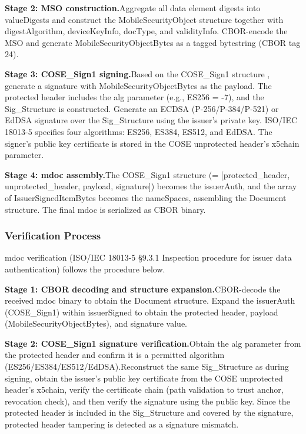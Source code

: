 \documentclass[conference]{IEEEtran}
\begin{document}
\textbf{Stage 2: MSO construction.}Aggregate all data element digests into valueDigests and construct the MobileSecurityObject structure together with digestAlgorithm, deviceKeyInfo, docType, and validityInfo. CBOR-encode the MSO and generate MobileSecurityObjectBytes as a tagged bytestring (CBOR tag 24).

\textbf{Stage 3: COSE\_Sign1 signing.}Based on the COSE\_Sign1 structure \cite{ref6}, generate a signature with MobileSecurityObjectBytes as the payload. The protected header includes the alg parameter (e.g., ES256 = -7), and the Sig\_Structure is constructed. Generate an ECDSA (P-256/P-384/P-521) or EdDSA signature over the Sig\_Structure using the issuer's private key. ISO/IEC 18013-5 specifies four algorithms: ES256, ES384, ES512, and EdDSA. The signer's public key certificate is stored in the COSE unprotected header's x5chain parameter.

\textbf{Stage 4: mdoc assembly.}The COSE\_Sign1 structure (= {[}protected\_header, unprotected\_header, payload, signature{]}) becomes the issuerAuth, and the array of IssuerSignedItemBytes becomes the nameSpaces, assembling the Document structure. The final mdoc is serialized as CBOR binary.

\subsubsection{Verification Process}

mdoc verification (ISO/IEC 18013-5 §9.3.1 Inspection procedure for issuer data authentication) follows the procedure below.

\textbf{Stage 1: CBOR decoding and structure expansion.}CBOR-decode the received mdoc binary to obtain the Document structure. Expand the issuerAuth (COSE\_Sign1) within issuerSigned to obtain the protected header, payload (MobileSecurityObjectBytes), and signature value.

\textbf{Stage 2: COSE\_Sign1 signature verification.}Obtain the alg parameter from the protected header and confirm it is a permitted algorithm (ES256/ES384/ES512/EdDSA).Reconstruct the same Sig\_Structure as during signing, obtain the issuer's public key certificate from the COSE unprotected header's x5chain, verify the certificate chain (path validation to trust anchor, revocation check), and then verify the signature using the public key. Since the protected header is included in the Sig\_Structure and covered by the signature, protected header tampering is detected as a signature mismatch.
\end{document}
